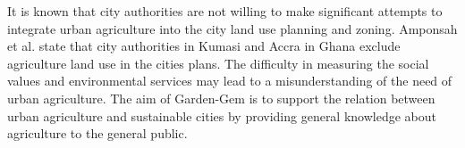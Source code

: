 It is known that city authorities are not willing to make significant attempts to integrate urban agriculture into the city land use planning and zoning. Amponsah et al. \cite{Amponsah2015, Amponsah2016} state that city authorities in Kumasi and Accra in Ghana exclude agriculture land use in the cities plans. The difficulty in measuring the social values and environmental services may lead to a misunderstanding of the need of urban agriculture. The aim of Garden-Gem is to support the relation between urban agriculture and sustainable cities by providing general knowledge about agriculture to the general public.



